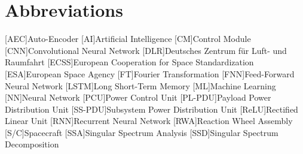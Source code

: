 

\usepackage{csquotes}
\usepackage{float}

\def\reporttype{Master Thesis}
\def\reporttitle{Neural Network Prediction Uncertainty for Spacecraft Housekeeping Analysis}
\def\reportauthor{Mattis Jaksch}
\def\reportsurveyfirst{Prof. Dr. Andreas Rittweger}
\def\reportsurveysecond{Dr. Frank Dannemann}  %
\def\reportadvisor{Jan-Gerd Meß}
\def\reportdate{18.01.2022}






{\frontmatter
	{\pagestyle{scrheadings}
		\setcounter{page}{1}

\thispagestyle{empty}
%		

\thispagestyle{empty}


\newpage \hfill
\newpage \hfill

\tableofcontents

\chapter*{Abbreviations}

\begin{acronym}
[AEC]{Auto-Encoder}
[AI]{Artificial Intelligence}
[CM]{Control Module}
[CNN]{Convolutional Neural Network}
[DLR]{Deutsches Zentrum für Luft- und Raumfahrt}
[ECSS]{European Cooperation for Space Standardization}
[ESA]{European Space Agency}
[FT]{Fourier Transformation}
[FNN]{Feed-Forward Neural Network}
[LSTM]{Long Short-Term Memory}
[ML]{Machine Learning}
[NN]{Neural Network}
[PCU]{Power Control Unit}
[PL-PDU]{Payload Power Distribution Unit}
[SS-PDU]{Subsystem Power Distribution Unit}
[ReLU]{Rectified Linear Unit}
[RNN]{Recurrent Neural Network}
[RWA]{Reaction Wheel Assembly}
[S/C]{Spacecraft}
[SSA]{Singular Spectrum Analysis}
[SSD]{Singular Spectrum Decomposition}
\end{acronym}

}}

